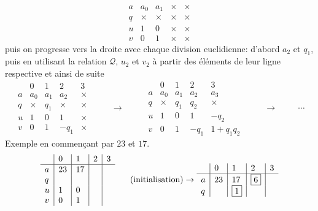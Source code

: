 \begin{propn}
\begin{displaymath}
\begin{array}{l|l|l|l|l}
a & a_0 & a_1 & × & × \\ 
q & × & × & × & × \\ 
u & 1 & 0 & × & × \\
v & 0 & 1 & × & ×
\end{array}
\end{displaymath}
puis on progresse vers la droite avec chaque division euclidienne: d'abord $a_2$ et $q_1$, puis en utilisant la relation $\mathcal Q$,  $u_2$ et $v_2$ à partir des éléments de leur ligne respective et ainsi de suite
\begin{displaymath}
\begin{array}{l|l|l|l|l}
 & 0 & 1 & 2 & 3 \\ \hline
a & a_0 & a_1 & a_2 & × \\ 
q & ×   & q_1 & ×   & × \\ 
u & 1   & 0   & 1 & × \\
v & 0   & 1   & -q_1 & ×
\end{array}
\hspace{1cm}\rightarrow\hspace{1cm}
\begin{array}{l|l|l|l|l}
 & 0 & 1 & 2 & 3 \\ \hline
a & a_0 & a_1 & a_2 & a_3 \\ 
q & ×   & q_1 & q_2   & × \\ 
u & 1   & 0   & 1 & -q_2 \\
v & 0   & 1   & -q_1 & 1+q_1q_2
\end{array}
\hspace{1cm}\rightarrow \hspace{1cm}\cdots
\end{displaymath}
Exemple en commençant par $23$ et $17$.
\begin{multline*}
\begin{array}{l|l|l|l|l}
 & 0 & 1 & 2 & 3 \\ \hline
a & 23 & 17 &  &  \\ 
q &    &    &  &  \\ 
u & 1  & 0  &  &  \\
v & 0  & 1  &  & 
\end{array}\hspace{0.5cm} \text{ (initialisation)}
\rightarrow
\begin{array}{l|l|l|l|l}
  & 0  & 1        & 2 & 3  \\ \hline
a & 23 & 17       & \fbox{6} &  \\ 
q &    & \fbox{1} &   &  \\ 

\end{array}
\end{multline*}
\end{propn}
